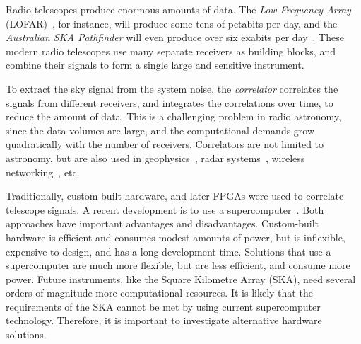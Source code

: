 \documentclass{article}
\begin{document}
Radio telescopes produce enormous amounts of data.
The \emph{Low-Frequency Array\/} (LOFAR)~\cite{deVos:09}, for instance, will produce some tens
of petabits per day, and the \emph{Australian SKA Pathfinder\/} will
even produce over six exabits per day~\cite{askap}.
These modern radio telescopes use many separate receivers as building blocks,
and combine their signals to form a single large and sensitive instrument.

To extract the sky signal from the system noise, the \emph{correlator\/}
correlates the signals from different receivers, and integrates the
correlations over time, to reduce the amount of data.
This is a challenging problem in radio astronomy,
since the data volumes are large, and the computational demands grow
quadratically with the number of receivers.
Correlators are not limited to astronomy, but are also used 
in geophysics~\cite{correlator-geophysics},
radar systems~\cite{correlator-radar}, 
wireless networking~\cite{correlator-wireless}, etc.

Traditionally, custom-built hardware, and later FPGAs were used to correlate telescope signals.
A recent development is to use a supercomputer~\cite{ppopp2010}.
Both approaches have important advantages and disadvantages.
Custom-built hardware is efficient and consumes modest amounts of power, but is
inflexible, expensive to design, and has a long development time.
Solutions that use a supercomputer are much more flexible, but are less
efficient, and consume more power. %
Future instruments, like the Square Kilometre Array (SKA), need several orders
of magnitude more computational resources.
It is likely that the requirements of the SKA cannot be met by using
current supercomputer technology. Therefore, it is important to investigate
alternative hardware solutions.
\end{document}
